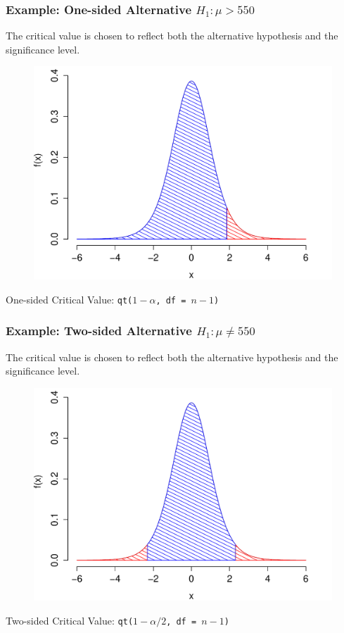 \begin{frame}
\frametitle{Example: One-sided Alternative $H_1\colon \mu > 550$}
The critical value is chosen to reflect both the alternative hypothesis and the significance level. 
\begin{figure}
\includegraphics[scale = 0.45]{./images/one_side}
\end{figure}
One-sided Critical Value: \texttt{qt($1-\alpha$, df  = $n-1$)}
\end{frame}



\begin{frame}
\frametitle{Example: Two-sided Alternative $H_1\colon \mu \neq 550$}
The critical value is chosen to reflect both the alternative hypothesis and the significance level. 
\begin{figure}
\includegraphics[scale = 0.45]{./images/two_side}
\end{figure}
Two-sided Critical Value: \texttt{qt($1-\alpha/2$, df  = $n-1$)}
\end{frame}

